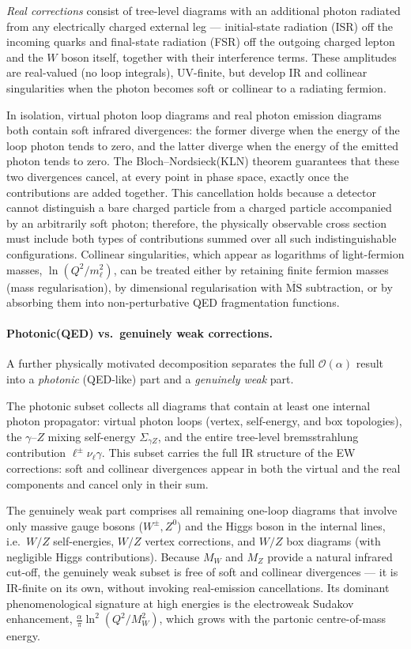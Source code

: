 \textit{Real corrections} consist of tree-level diagrams with an additional photon
radiated from any electrically charged external leg --- initial-state radiation (ISR)
off the incoming quarks and final-state radiation (FSR) off the outgoing charged lepton and
the $W$ boson itself, together with their interference terms.
These amplitudes are real-valued (no loop integrals), UV-finite, but
develop IR and collinear singularities when the photon becomes soft or collinear
to a radiating fermion.

In isolation, virtual photon loop diagrams and real photon emission diagrams both contain soft infrared divergences: the former diverge when the energy of the loop photon tends to zero, and the latter diverge when the energy of the emitted photon tends to zero. The Bloch--Nordsieck(KLN) theorem guarantees that these two divergences cancel, at every point in phase space, exactly once the contributions are added together. This cancellation holds because a detector cannot distinguish a bare charged particle from a charged particle accompanied by an arbitrarily soft photon; therefore, the physically observable cross section must include both types of contributions summed over all such indistinguishable configurations.
Collinear singularities, which appear as logarithms of light-fermion masses,
$\ln(Q^{2}/m_{\ell}^{2})$, can be treated either by retaining finite fermion masses
(mass regularisation), by dimensional regularisation with $\overline{\mathrm{MS}}$
subtraction, or by absorbing them into non-perturbative QED fragmentation functions.

\paragraph{Photonic(QED) vs.\ genuinely weak corrections.}
A further physically motivated decomposition separates the full $\mathcal{O}(\alpha)$
result into a \textit{photonic} (QED-like) part and a \textit{genuinely weak} part.

The photonic subset collects all diagrams that contain at least one internal photon
propagator: virtual photon loops (vertex, self-energy, and box topologies),
the $\gamma$--$Z$ mixing self-energy $\Sigma_{\gamma Z}$, and the entire
tree-level bremsstrahlung contribution $\ell^{\pm}\nu_{\ell}\gamma$.
This subset carries the full IR structure of the EW corrections:
soft and collinear divergences appear in both the virtual and the real components
and cancel only in their sum.

The genuinely weak part comprises all remaining one-loop diagrams that involve
only massive gauge bosons ($W^{\pm},Z^{0}$) and the Higgs boson in the internal
lines, i.e.\ $W/Z$ self-energies, $W/Z$ vertex corrections, and $W/Z$ box diagrams
(with negligible Higgs contributions). Because $M_W$ and $M_Z$ provide a natural
infrared cut-off, the genuinely weak subset is free of soft and collinear
divergences --- it is IR-finite on its own, without invoking real-emission
cancellations. Its dominant phenomenological signature at high energies is the
electroweak Sudakov enhancement, $\frac{\alpha}{\pi}\ln^{2}(Q^{2}/M_{W}^{2})$,
which grows with the partonic centre-of-mass energy.


